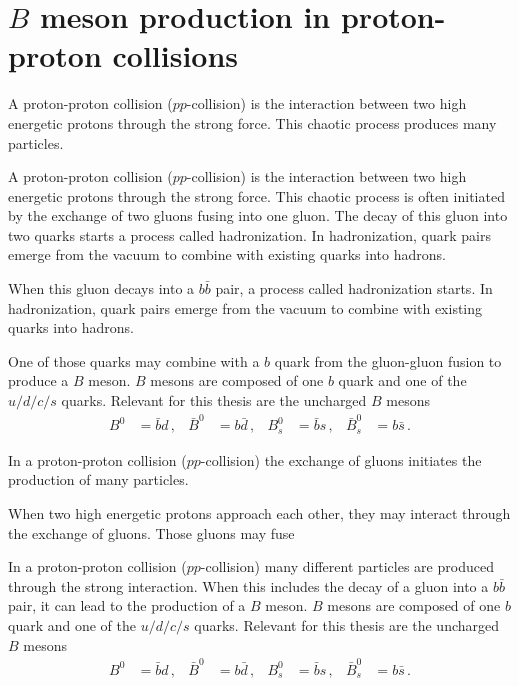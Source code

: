 \section{$B$ meson production in proton-proton collisions}

A proton-proton collision ($pp$-collision) is the interaction between two high energetic protons through the strong force.
This chaotic process produces many particles.





A proton-proton collision ($pp$-collision) is the interaction between two high energetic protons through the strong force.
This chaotic process is often initiated by the exchange of two gluons fusing into one gluon.
The decay of this gluon into two quarks starts a process called hadronization.
In hadronization, quark pairs emerge from the vacuum to combine with existing quarks into hadrons.




When this gluon decays into a $b\bar{b}$ pair, a process called hadronization starts.
In hadronization, quark pairs emerge from the vacuum to combine with existing quarks into hadrons. 


One of those quarks may combine with a $b$ quark from the gluon-gluon fusion to produce a $B$ meson.
$B$ mesons are composed of one $b$ quark and one of the $u/d/c/s$ quarks.
Relevant for this thesis are the uncharged $B$ mesons
\begin{align*}
    B^0 &= \bar{b}d \, , & \bar{B}^0 &= b\bar{d} \, , & B_s^0 &= \bar{b}s \, , & \bar{B}_s^0 &= b\bar{s} \, .
\end{align*}

In a proton-proton collision ($pp$-collision) the exchange of gluons initiates the production of many particles.

When two high energetic protons approach each other, they may interact through the exchange of gluons.
Those gluons may fuse





In a proton-proton collision ($pp$-collision) many different particles are produced through the strong interaction.
When this includes the decay of a gluon into a $b\bar{b}$ pair, it can lead to the production of a $B$ meson.
$B$ mesons are composed of one $b$ quark and one of the $u/d/c/s$ quarks.
Relevant for this thesis are the uncharged $B$ mesons
\begin{align*}
    B^0 &= \bar{b}d \, , & \bar{B}^0 &= b\bar{d} \, , & B_s^0 &= \bar{b}s \, , & \bar{B}_s^0 &= b\bar{s} \, .
\end{align*}


